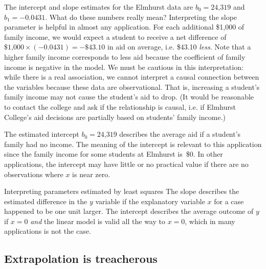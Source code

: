 \begin{examplewrap}
\begin{nexample}{The intercept and slope estimates for
    the Elmhurst data are $b_0 = \text{24,319}$
    and $b_1 = -0.0431$.
    What do these numbers really mean?}
  Interpreting the slope parameter is helpful in almost any
  application.
  For each additional \$1,000 of family income, we would expect
  a student to receive a net difference of
  $\$\text{1,000}\times (-0.0431) = -\$43.10$ in aid on average,
  i.e. \$43.10 \emph{less}.
  Note that a higher family income corresponds to less aid
  because the coefficient of family income is negative in
  the model.
  We must be cautious in this interpretation:
  while there is a real association, we cannot interpret
  a causal connection between the variables because these
  data are observational.
  That is, increasing a student's family income may not
  cause the student's aid to drop.
  (It would be reasonable to contact the college and ask
  if the relationship is causal,
  i.e. if Elmhurst College's aid decisions are partially
  based on students' family income.)

  The estimated intercept $b_0 = \text{24,319}$
  describes the average aid if a student's family had no income.
  The meaning of the intercept is relevant to this application
  since the family income for some students at Elmhurst is~\$0.
  In other applications, the intercept may have little
  or no practical value if there are no observations where
  $x$ is near zero.
\end{nexample}
\end{examplewrap}

\begin{onebox}{Interpreting parameters estimated by least squares}
  The slope describes the estimated difference in the
  $y$ variable if the explanatory variable $x$ for a case
  happened to be one unit larger.
  The intercept describes the average outcome of $y$ if $x=0$
  \emph{and} the linear model is valid all the way to $x=0$,
  which in many applications is not the case.
\end{onebox}



\D{\newpage}

\subsection{Extrapolation is treacherous}


